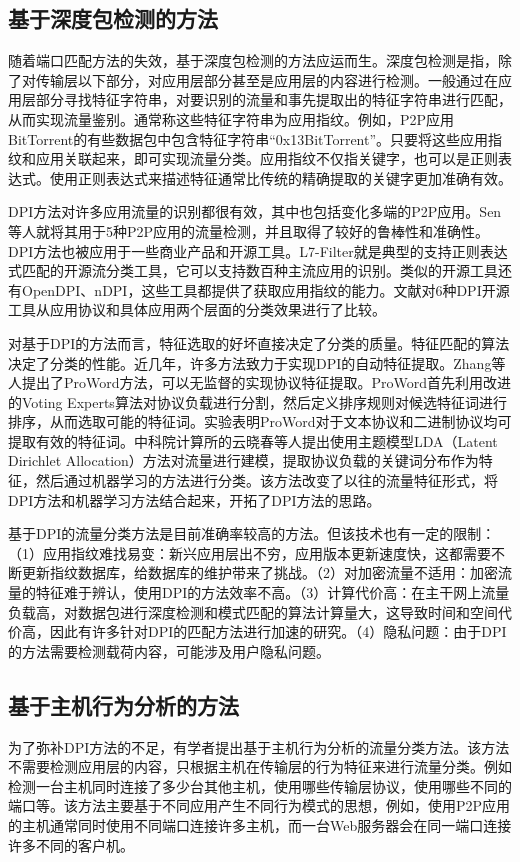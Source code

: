 \subsection{基于深度包检测的方法}

随着端口匹配方法的失效，基于深度包检测的方法应运而生。深度包检测是指，除了对传输层以下部分，对应用层部分甚至是应用层的内容进行检测。一般通过在应用层部分寻找特征字符串，对要识别的流量和事先提取出的特征字符串进行匹配，从而实现流量鉴别。通常称这些特征字符串为应用指纹。例如，P2P应用BitTorrent的有些数据包中包含特征字符串“0x13BitTorrent”。只要将这些应用指纹和应用关联起来，即可实现流量分类。应用指纹不仅指关键字，也可以是正则表达式。使用正则表达式来描述特征通常比传统的精确提取的关键字更加准确有效。

DPI方法对许多应用流量的识别都很有效，其中也包括变化多端的P2P应用。Sen等人就将其用于5种P2P应用的流量检测，并且取得了较好的鲁棒性和准确性\supercite{sen2004accurate}。DPI方法也被应用于一些商业产品和开源工具。L7-Filter\supercite{l7filter}就是典型的支持正则表达式匹配的开源流分类工具，它可以支持数百种主流应用的识别。类似的开源工具还有OpenDPI、nDPI，这些工具都提供了获取应用指纹的能力。文献\cite{bujlow2015independent}对6种DPI开源工具从应用协议和具体应用两个层面的分类效果进行了比较。

对基于DPI的方法而言，特征选取的好坏直接决定了分类的质量。特征匹配的算法决定了分类的性能。近几年，许多方法致力于实现DPI的自动特征提取。Zhang等人提出了ProWord方法\supercite{zhang2014proword}，可以无监督的实现协议特征提取。ProWord首先利用改进的Voting Experts算法对协议负载进行分割，然后定义排序规则对候选特征词进行排序，从而选取可能的特征词。实验表明ProWord对于文本协议和二进制协议均可提取有效的特征词。中科院计算所的云晓春等人\supercite{yun2016semantics}提出使用主题模型LDA（Latent Dirichlet Allocation）方法对流量进行建模，提取协议负载的关键词分布作为特征，然后通过机器学习的方法进行分类。该方法改变了以往的流量特征形式，将DPI方法和机器学习方法结合起来，开拓了DPI方法的思路。

基于DPI的流量分类方法是目前准确率较高的方法。但该技术也有一定的限制：（1）应用指纹难找易变：新兴应用层出不穷，应用版本更新速度快，这都需要不断更新指纹数据库，给数据库的维护带来了挑战。（2）对加密流量不适用：加密流量的特征难于辨认，使用DPI的方法效率不高。（3）计算代价高：在主干网上流量负载高，对数据包进行深度检测和模式匹配的算法计算量大，这导致时间和空间代价高，因此有许多针对DPI的匹配方法进行加速的研究\supercite{ikeuchi2013gpu,vasiliadis2014gaspp}。（4）隐私问题：由于DPI的方法需要检测载荷内容，可能涉及用户隐私问题。

\subsection{基于主机行为分析的方法}
为了弥补DPI方法的不足，有学者提出基于主机行为分析的流量分类方法。该方法不需要检测应用层的内容，只根据主机在传输层的行为特征来进行流量分类。例如检测一台主机同时连接了多少台其他主机，使用哪些传输层协议，使用哪些不同的端口等。该方法主要基于不同应用产生不同行为模式的思想，例如，使用P2P应用的主机通常同时使用不同端口连接许多主机，而一台Web服务器会在同一端口连接许多不同的客户机。

